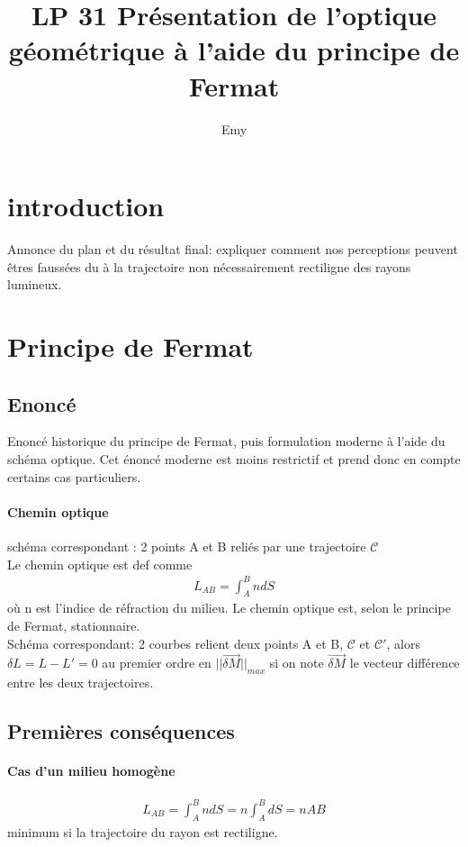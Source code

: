 \documentclass[12pt,prb,aps,epsf]{report}
\begin{document}
	
	\title{LP 31 Présentation de l'optique géométrique à l'aide du principe de Fermat}
	\author{Emy}
	
	\maketitle
	
	\tableofcontents
	
	\pagebreak
	
\section{introduction}
Annonce du plan et du résultat final: expliquer comment nos perceptions peuvent êtres faussées du à la trajectoire non nécessairement rectiligne des rayons lumineux.

\section{Principe de Fermat}
\subsection{Enoncé}
Enoncé historique du principe de Fermat, puis formulation moderne à l'aide du schéma optique. Cet énoncé moderne est moins restrictif et prend donc en compte certains cas particuliers.
\paragraph{Chemin optique}
schéma correspondant : 2 points A et B reliés par une trajectoire $\mathcal{C}$\\
Le chemin optique est def comme 
\begin{eqnarray}
L_{AB} = \int_A^BndS
\end{eqnarray}
où n est l'indice de réfraction du milieu. Le chemin optique est, selon le principe de Fermat, stationnaire.\\
Schéma correspondant: 2 courbes relient deux points A et B, $\mathcal{C}$ et $\mathcal{C}'$, alors $\delta L = L-L' = 0$ au premier ordre en $||\vec{\delta M}||_{max}$ si on note $\vec{\delta M}$ le vecteur différence entre les deux trajectoires.
\subsection{Premières conséquences}
\paragraph{Cas d'un milieu homogène}
\begin{eqnarray}
L_{AB} = \int_A^BndS = n\int_A^BdS = nAB
\end{eqnarray}
minimum si la trajectoire du rayon est rectiligne.
\end{document}
